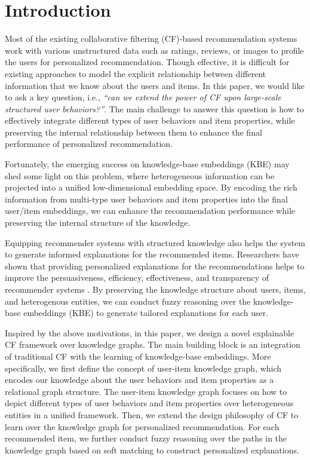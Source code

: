 \documentclass[algorithms,article,accept,moreauthors,pdftex,10pt,a4paper]{Definitions/mdpi}
\begin{document}
\section{Introduction}
Most of the existing collaborative filtering (CF)-based recommendation systems work with various unstructured data such as ratings, reviews, or images to profile the users for personalized recommendation. Though effective, it is difficult for existing approaches to model the explicit relationship between different information that we know about the users and items. 
In this paper, we would like to ask a key question, i.e., \emph{``can we extend the power of CF upon large-scale structured user behaviors?''}. 
The main challenge to answer this question is how to effectively integrate different types of user behaviors and item properties, while preserving the internal relationship between them to enhance the final performance of personalized recommendation.

Fortunately, the emerging success on knowledge-base embeddings (KBE) may shed some light on this problem, where heterogeneous information can be projected into a unified low-dimensional embedding space. By encoding the rich information from multi-type user behaviors and item properties into the final user/item embeddings, we can enhance the recommendation performance while preserving the internal structure of the knowledge.

Equipping recommender systems with structured knowledge also helps the system to generate informed explanations for the recommended items. Researchers have shown that providing personalized explanations for the recommendations helps to improve the persuasiveness, efficiency, effectiveness, and transparency of recommender systems \cite{zhang2018explainable,zhang2014explicit,herlocker2000explaining, tintarev2007survey,bilgic2005explaining, cramer2008effects, tintarev2011designing}. By preserving the knowledge structure about users, items, and heterogenous entities, we can conduct fuzzy reasoning over the knowledge-base embeddings (KBE) to generate tailored explanations for each user.






Inspired by the above motivations, in this paper, we design a novel explainable CF framework over knowledge graphs. The main building block is an integration of traditional CF with the learning of knowledge-base embeddings. More specifically, we first define the concept of user-item knowledge graph, which encodes our knowledge about the user behaviors and item properties as a relational graph structure. The user-item knowledge graph focuses on how to depict different types of user behaviors and item properties over heterogeneous entities in a unified framework. Then, we extend the design philosophy of CF to learn over the knowledge graph for personalized recommendation. For each recommended item, we further conduct fuzzy reasoning over the paths in the knowledge graph based on soft matching to construct personalized explanations.
\end{document}
